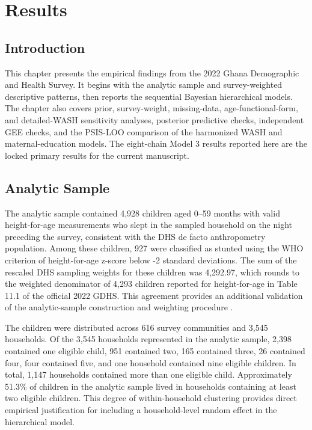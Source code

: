 \chapter{Results}
\label{chap:results}

\section{Introduction}

This chapter presents the empirical findings from the 2022 Ghana Demographic and Health Survey. It begins with the analytic sample and survey-weighted descriptive patterns, then reports the sequential Bayesian hierarchical models. The chapter also covers prior, survey-weight, missing-data, age-functional-form, and detailed-WASH sensitivity analyses, posterior predictive checks, independent GEE checks, and the PSIS-LOO comparison of the harmonized WASH and maternal-education models. The eight-chain Model 3 results reported here are the locked primary results for the current manuscript.

\section{Analytic Sample}

The analytic sample contained 4,928 children aged 0--59 months with valid height-for-age measurements who slept in the sampled household on the night preceding the survey, consistent with the DHS de facto anthropometry population. Among these children, 927 were classified as stunted using the WHO criterion of height-for-age z-score below -2 standard deviations. The sum of the rescaled DHS sampling weights for these children was 4,292.97, which rounds to the weighted denominator of 4,293 children reported for height-for-age in Table 11.1 of the official 2022 GDHS. This agreement provides an additional validation of the analytic-sample construction and weighting procedure \citep{GSSICF2024}.

The children were distributed across 616 survey communities and 3,545 households. Of the 3,545 households represented in the analytic sample, 2,398 contained one eligible child, 951 contained two, 165 contained three, 26 contained four, four contained five, and one household contained nine eligible children. In total, 1,147 households contained more than one eligible child. Approximately 51.3\% of children in the analytic sample lived in households containing at least two eligible children. This degree of within-household clustering provides direct empirical justification for including a household-level random effect in the hierarchical model.

